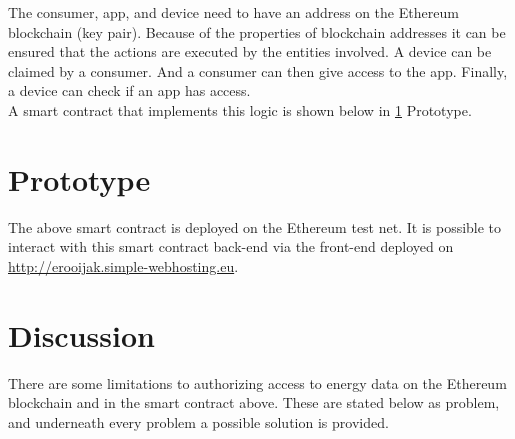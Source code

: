 \documentclass[paper=a4, fontsize=11pt]{scrartcl}
\numberwithin{equation}{section} %
\numberwithin{figure}{section}   %
\numberwithin{table}{section}    %
\begin{document}
The consumer, app, and device need to have an address on the Ethereum blockchain
(key pair). Because of the properties of blockchain addresses it can be ensured
that the actions are executed by the entities involved. A device can be claimed
by a consumer. And a consumer can then give access to the app. Finally,
a device can check if an app has access.\\

A smart contract that implements this logic is shown below in \ref{prototype} Prototype.\\

\section{Prototype}
\label{prototype}

%


The above smart contract is deployed on the Ethereum test net. It is possible to
interact with this smart contract back-end via the front-end deployed on
\url{http://erooijak.simple-webhosting.eu}.\\

\section{Discussion}
\label{discussion}

There are some limitations to authorizing access to energy data on the Ethereum
blockchain and in the smart contract above. These are stated below as problem,
and underneath every problem a possible solution is provided.
\end{document}
